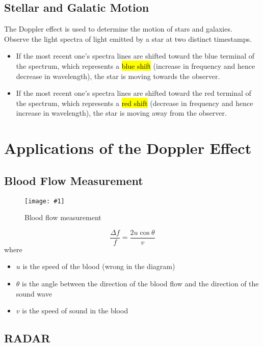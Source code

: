 \documentclass[a4paper,12pt]{article}
\let\oldsection\section
\renewcommand\section{\clearpage\oldsection}
\newcommand{\lb}{\\[8pt]}
\newcommand{\img}[4]{\begin{center}
  \begin{figure}[H]
    \centering
    \texttt{[image: \#1]}
    \caption{#3}
    \label{fig:#4}
  \end{figure}
\end{center}}
\begin{document}
\pagebreak

\subsection{Stellar and Galatic Motion}

The Doppler effect is used to determine the motion of stars and galaxies. \lb
Observe the light spectra of light emitted by a star at two distinct timestamps.
\begin{itemize}
  \item If the most recent one's spectra lines are shifted toward the blue terminal of the spectrum, which represents a \hl{blue shift} (increase in frequency and hence decrease in wavelength), the star is moving towards the observer.
  \item If the most recent one's spectra lines are shifted toward the red terminal of the spectrum, which represents a \hl{red shift} (decrease in frequency and hence increase in wavelength), the star is moving away from the observer.
\end{itemize}

\section{Applications of the Doppler Effect}

\subsection{Blood Flow Measurement}

\img{bloodvessel.png}{0.5}{Blood flow measurement}{bloodvessel}

\begin{equation}
  \frac{\Delta f}{f} = \frac{2u\cos\theta}{v}
\end{equation}
where
\begin{itemize}
  \item $u$ is the speed of the blood (wrong in the diagram)
  \item $\theta$ is the angle between the direction of the blood flow and the direction of the sound wave
  \item $v$ is the speed of sound in the blood
\end{itemize}

\pagebreak

\subsection{RADAR}
\end{document}
